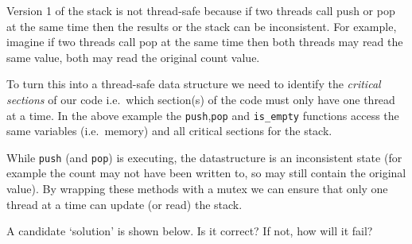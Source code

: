Version 1 of the stack is not thread-safe because if two threads call
push or pop at the same time then the results or the stack can be
inconsistent. For example, imagine if two threads call pop at the same
time then both threads may read the same value, both may read the
original count value.

To turn this into a thread-safe data structure we need to identify the
\emph{critical sections} of our code i.e.~which section(s) of the code
must only have one thread at a time. In the above example the
\texttt{push},\texttt{pop} and \texttt{is\_empty} functions access the
same variables (i.e.~memory) and all critical sections for the stack.

While \texttt{push} (and \texttt{pop}) is executing, the datastructure
is an inconsistent state (for example the count may not have been
written to, so may still contain the original value). By wrapping these
methods with a mutex we can ensure that only one thread at a time can
update (or read) the stack.

A candidate `solution' is shown below. Is it correct? If not, how will
it fail?

\begin{Shaded}
\begin{Highlighting}[]
 
 


  
\NormalTok{\}}

 
     

     
\NormalTok{\}}

 
     \NormalTok{;}
\NormalTok{\}}
\end{Highlighting}
\end{Shaded}

